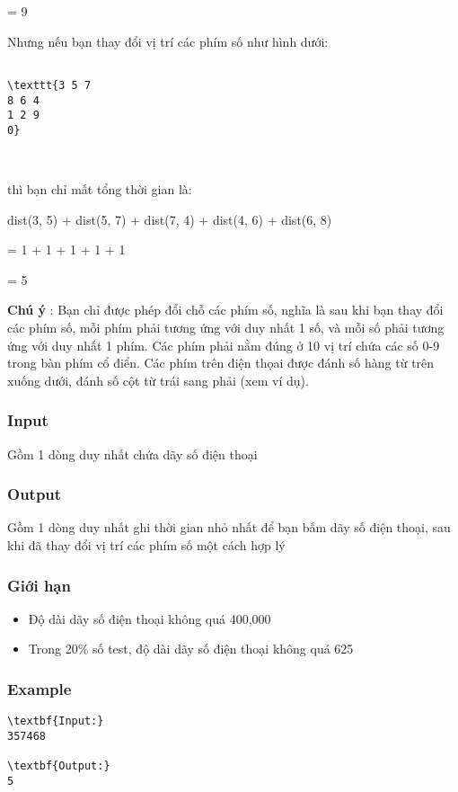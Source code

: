 = 9

Nhưng nếu bạn thay đổi vị trí các phím số như hình dưới:
\begin{verbatim}

\texttt{3 5 7
8 6 4
1 2 9
0}\end{verbatim}

 

thì bạn chỉ mất tổng thời gian là:

dist(3, 5) + dist(5, 7) + dist(7, 4) + dist(4, 6) + dist(6, 8)

= 1 + 1 + 1 + 1 + 1

= 5

\textbf{Chú ý } : Bạn chỉ được phép đổi chỗ các phím số, nghĩa là sau khi bạn thay đổi các phím số, mỗi phím phải tương ứng với duy nhất 1 số, và mỗi số phải tương ứng với duy nhất 1 phím. Các phím phải nằm đúng ở 10 vị trí chứa các số 0-9 trong bàn phím cổ điển. Các phím trên điện thọai được đánh số hàng từ trên xuống dưới, đánh số cột từ trái sang phải (xem ví dụ).

\subsubsection{Input}

Gồm 1 dòng duy nhất chứa dãy số điện thoại

\subsubsection{Output}

Gồm 1 dòng duy nhất ghi thời gian nhỏ nhất để bạn bấm dãy số điện thoại, sau khi đã thay đổi vị trí các phím số một cách hợp lý

\subsubsection{Giới hạn}
\begin{itemize}
	\item Độ dài dãy số điện thoại không quá 400,000
	\item Trong 20\% số test, độ dài dãy số điện thoại không quá 625
\end{itemize}

\subsubsection{Example}
\begin{verbatim}
\textbf{Input:}
357468

\textbf{Output:}
5\end{verbatim}